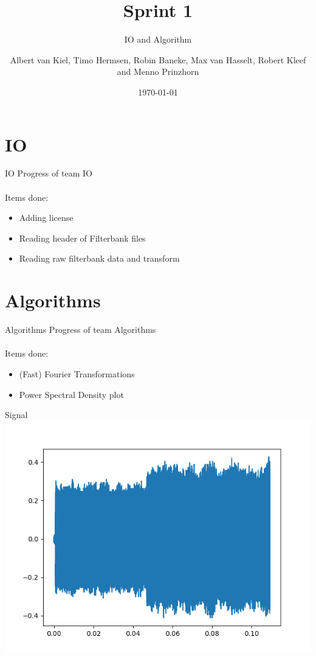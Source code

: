\documentclass{beamer}
\title{Sprint 1}
\subtitle{IO and Algorithm}
\author{Albert van Kiel, Timo Hermsen, Robin Baneke, Max van Hasselt, Robert Kleef and Menno Prinzhorn}
\date{\today}
\begin{document}
\begin{frame}
    \titlepage
\end{frame}

\section{IO}
    
\begin{frame}{IO}
    Progress of team IO
    \\~\\
    Items done:
    \begin{itemize}
        \item Adding license
        \item Reading header of Filterbank files
        \item Reading raw filterbank data and transform
    \end{itemize}
\end{frame}


\section{Algorithms}
\begin{frame}{Algorithms}
	Progress of team Algorithms
	\\~\\
	Items done:
	\begin{itemize}
		\item (Fast) Fourier Transformations
		\item Power Spectral Density plot
	\end{itemize}
\end{frame}


\begin{frame}{Signal}
	\includegraphics[scale=0.6]{signal}
\end{frame}
\end{document}
